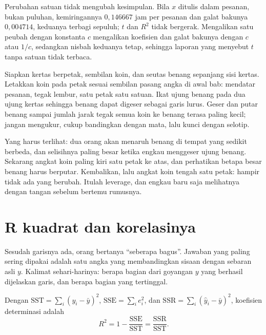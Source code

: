 Perubahan satuan tidak mengubah kesimpulan. Bila $x$ ditulis dalam pesanan, bukan
puluhan, kemiringannya $0{,}146667$ jam per pesanan dan galat bakunya $0{,}004714$,
keduanya terbagi sepuluh; $t$ dan $R^2$ tidak bergerak. Mengalikan satu peubah dengan
konstanta $c$ mengalikan koefisien dan galat bakunya dengan $c$ atau $1/c$, sedangkan
nisbah keduanya tetap, sehingga laporan yang menyebut $t$ tanpa satuan tidak terbaca.

\begin{tangan}
Siapkan kertas berpetak, sembilan koin, dan seutas benang sepanjang sisi kertas. Letakkan
koin pada petak sesuai sembilan pasang angka di awal bab: mendatar pesanan, tegak lembur,
satu petak satu satuan. Ikat ujung benang pada dua ujung kertas sehingga benang dapat
digeser sebagai garis lurus. Geser dan putar benang sampai jumlah jarak tegak semua koin
ke benang terasa paling kecil; jangan mengukur, cukup bandingkan dengan mata, lalu
kunci dengan selotip.

Yang harus terlihat: dua orang akan menaruh benang di tempat yang sedikit berbeda, dan
selisihnya paling besar ketika engkau menggeser ujung benang. Sekarang angkat koin
paling kiri satu petak ke atas, dan perhatikan betapa besar benang harus berputar.
Kembalikan, lalu angkat koin tengah satu petak: hampir tidak ada yang berubah. Itulah
leverage, dan engkau baru saja melihatnya dengan tangan sebelum bertemu rumusnya.
\end{tangan}

\section{R kuadrat dan korelasinya}

Sesudah garisnya ada, orang bertanya ``seberapa bagus''. Jawaban yang paling sering
dipakai adalah satu angka yang membandingkan sisaan dengan sebaran asli $y$. Kalimat
sehari-harinya: berapa bagian dari goyangan $y$ yang berhasil dijelaskan garis, dan
berapa bagian yang tertinggal.

\begin{definisi}[$R^2$]
Dengan $\mathrm{SST}=\sum_i(y_i-\bar y)^2$, $\mathrm{SSE}=\sum_i e_i^2$, dan
$\mathrm{SSR}=\sum_i(\hat y_i-\bar y)^2$, koefisien determinasi adalah
\[
R^2=1-\frac{\mathrm{SSE}}{\mathrm{SST}}=\frac{\mathrm{SSR}}{\mathrm{SST}} .
\]
\end{definisi}


